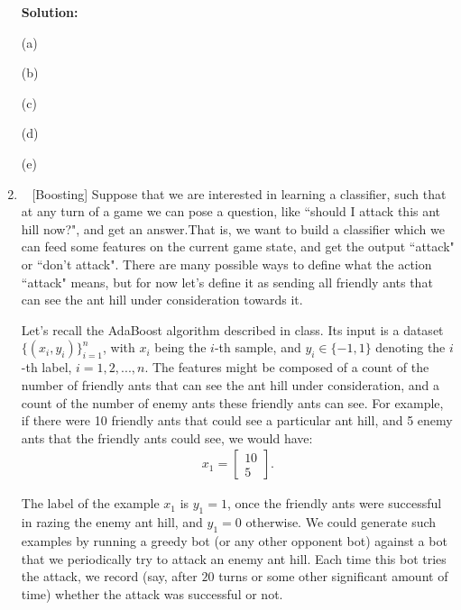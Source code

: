\documentclass[10pt]{article}
\begin{document}
\begin{enumerate}[1.]
\begin{itemize}
     
	      \end{itemize}

		  \textbf{Solution:}

(a)



(b)





(c)




(d)





(e)












	      \newpage

    \item ~ [Boosting]
        Suppose that we are interested in learning a classifier, such that at any turn of a game we can pose a question, like ``should I attack this ant hill now?", and get an answer.That is, we want to build a classifier which we can feed some features on the current game state, and get the output ``attack" or ``don't attack". There are many possible ways to define what the action ``attack" means, but for now let's define it as sending all friendly ants that can see the ant hill under consideration towards it.

	    Let's recall the AdaBoost algorithm described in class. Its input is a dataset $\{(x_{i},y_{i})\}_{i=1}^{n}$, with $x_i$ being the $i$-th sample, and $y_{i}\in \{-1,1\}$ denoting the $i$-th label, $i=1,2,...,n$. The features might be composed of a count of the number of friendly ants that can see the ant hill under consideration, and a count of the number of enemy ants these friendly ants can see. For example, if there were 10 friendly ants that could see a particular ant hill, and 5 enemy ants that the friendly ants could see, we would have:
	    \begin{align*}
		    x_1 = \begin{bmatrix}
			10 \\
			5
		    \end{bmatrix}.
	    \end{align*}

	    The label of the example $x_{1}$ is $y_{1} = 1$, once the friendly ants were successful in razing the enemy ant hill, and $y_{1} = 0$ otherwise. We could generate such examples by running a greedy bot (or any other opponent bot) against a bot that we periodically try to attack an enemy ant hill. Each time this bot tries the attack, we record (say, after $20$ turns or some other significant amount of time) whether the attack was successful or not.


\end{enumerate}
\end{document}
